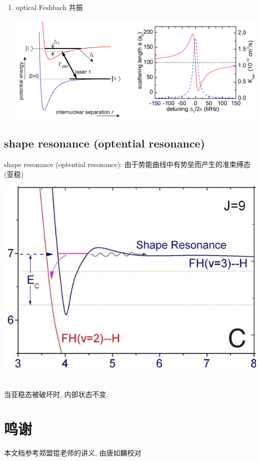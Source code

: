 \documentclass[10pt,a4paper,twocolumn]{article} %
\numberwithin{equation}{section} %
\begin{document}
\begin{enumerate}
\begin{centering}
	\end{centering}
	\item optical Feshbach 共振\\
	\begin{centering}
		\includegraphics[width=\linewidth]{ofr.jpg}
	\end{centering}
\end{enumerate}
\subsection{shape resonance (optential resonance)} %
\label{sub:shape_resonance}
shape resonance (optential resonance): 
由于势能曲线中有势垒而产生的准束缚态 (亚稳)\\
\begin{centering}
	\includegraphics[width=\linewidth]{shape-res.jpg}
\end{centering}\\
当亚稳态被破坏时, 内部状态不变.
\section*{鸣谢} 
本文档参考郑盟锟老师的讲义, 由唐如麟校对
\end{document}
